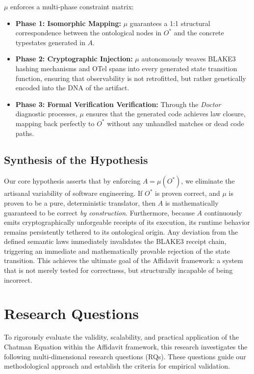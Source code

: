 $\mu$ enforces a multi-phase constraint matrix:
\begin{itemize}
    \item \textbf{Phase 1: Isomorphic Mapping:} $\mu$ guarantees a 1:1 structural correspondence between the ontological nodes in $O^*$ and the concrete typestates generated in $A$.
    \item \textbf{Phase 2: Cryptographic Injection:} $\mu$ autonomously weaves BLAKE3 hashing mechanisms and OTel spans into every generated state transition function, ensuring that observability is not retrofitted, but rather genetically encoded into the DNA of the artifact.
    \item \textbf{Phase 3: Formal Verification Verification:} Through the \textit{Doctor} diagnostic processes, $\mu$ ensures that the generated code achieves law closure, mapping back perfectly to $O^*$ without any unhandled matches or dead code paths.
\end{itemize}

\subsection{Synthesis of the Hypothesis}
Our core hypothesis asserts that by enforcing $A = \mu(O^*)$, we eliminate the artisanal variability of software engineering. If $O^*$ is proven correct, and $\mu$ is proven to be a pure, deterministic translator, then $A$ is mathematically guaranteed to be correct \textit{by construction}. Furthermore, because $A$ continuously emits cryptographically unforgeable receipts of its execution, its runtime behavior remains persistently tethered to its ontological origin. Any deviation from the defined semantic laws immediately invalidates the BLAKE3 receipt chain, triggering an immediate and mathematically provable rejection of the state transition. This achieves the ultimate goal of the Affidavit framework: a system that is not merely tested for correctness, but structurally incapable of being incorrect.

\section{Research Questions}
\label{sec:research_questions}

To rigorously evaluate the validity, scalability, and practical application of the Chatman Equation within the Affidavit framework, this research investigates the following multi-dimensional research questions (RQs). These questions guide our methodological approach and establish the criteria for empirical validation.

